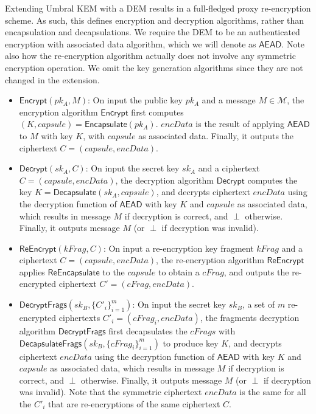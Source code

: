 \documentclass{amsart}
\begin{document}
Extending Umbral KEM with a DEM results in a full-fledged proxy re-encryption scheme. As such, this defines encryption and decryption algorithms, rather than encapsulation and decapsulations. We require the DEM to be an authenticated encryption with associated data algorithm, which we will denote as $\mathsf{AEAD}$. Note also how the re-encryption algorithm actually does not involve any symmetric encryption operation. We omit the key generation algorithms since they are not changed in the extension. 

\begin{itemize}
	
	\item $\mathsf{Encrypt}(pk_A, M)$: On input the public key $pk_A$ and a message $M\in\mathcal{M}$, the encryption algorithm $\mathsf{Encrypt}$ first computes $(K, capsule) = \mathsf{Encapsulate}(pk_A)$. 
	$encData$ is the result of applying $\mathsf{AEAD}$ to $M$ with key $K$, with $capsule$ as associated data. 
	Finally, it outputs the ciphertext $C = (capsule, encData)$.
	
	\item $\mathsf{Decrypt}(sk_A, C)$: On input the secret key $sk_A$ and a ciphertext $C = (capsule, encData)$, the decryption algorithm $\mathsf{Decrypt}$ computes the key $K = \mathsf{Decapsulate}(sk_A, capsule)$, and decrypts ciphertext $encData$ using the decryption function of $\mathsf{AEAD}$ with key $K$ and $capsule$ as associated data, which results in message $M$ if decryption is correct, and $\perp$ otherwise. Finally, it outputs message $M$ (or $\perp$ if decryption was invalid).
	
	\item $\mathsf{ReEncrypt}(kFrag, C)$: On input a re-encryption key fragment $kFrag$ and a ciphertext $C = (capsule, encData)$, the re-encryption algorithm $\mathsf{ReEncrypt}$ applies $\mathsf{ReEncapsulate}$ to the $capsule$ to obtain a $cFrag$, and outputs the re-encrypted ciphertext $C' = (cFrag, encData)$.
	
	\item $\mathsf{DecryptFrags}(sk_B, \{C'_i\}_{i=1}^m)$: On input the secret key $sk_B$, a set of $m$ re-encrypted ciphertexts $C'_i = (cFrag_i, encData)$, the fragments decryption algorithm $\mathsf{DecryptFrags}$ first decapsulates the $cFrags$ with $\mathsf{DecapsulateFrags}(sk_B, \{cFrag_i\}_{i=1}^m)$ to produce key $K$, and decrypts ciphertext $encData$ using the decryption function of $\mathsf{AEAD}$ with key $K$ and $capsule$ as associated data, which results in message $M$ if decryption is correct, and $\perp$ otherwise. Finally, it outputs message $M$ (or $\perp$ if decryption was invalid).	Note that the symmetric ciphertext $encData$ is the same for all the $C'_i$ that are re-encryptions of the same ciphertext $C$. 
	
\end{itemize}
	
\end{document}
